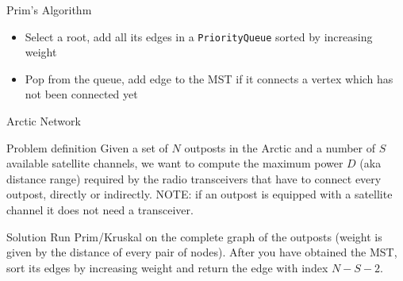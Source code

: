 \documentclass{beamer}
\begin{document}
  \begin{frame}{Prim's Algorithm}
    \begin{itemize}
      \item Select a root, add all its edges in a \texttt{PriorityQueue} sorted by increasing weight
      \item Pop from the queue, add edge to the MST if it connects a vertex which has not been connected yet
    \end{itemize}
    \begin{figure}[!htb]
    \end{figure}
  \end{frame}

  \begin{frame}{Arctic Network}
    \begin{block}{Problem definition}
      Given a set of $N$ outposts in the Arctic and a number of $S$ available satellite channels,
      we want to compute the maximum power $D$ (aka distance range) required by the radio transceivers that have to connect every outpost, directly or indirectly.
      \alert{NOTE:} if an outpost is equipped with a satellite channel it does not need a transceiver.
    \end{block}
    \pause
    \begin{block}{Solution}
      Run Prim/Kruskal on the complete graph of the outposts (weight is given by the distance of every pair of nodes). 
      After you have obtained the MST, sort its edges by increasing weight and return the edge with index $N-S-2$.
    \end{block}
  \end{frame}
  
\end{document}

